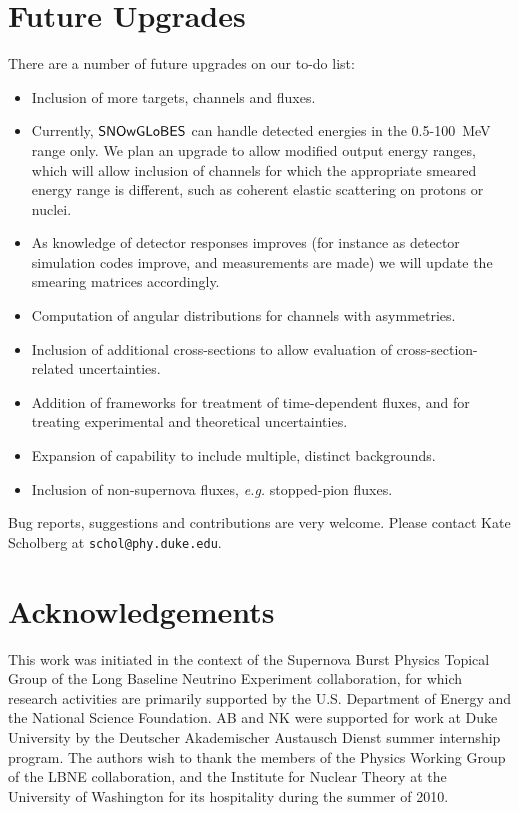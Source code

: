\documentclass[12pt]{article}
\newcommand{\snowglobes}{\sf{SNOwGLoBES}}
\begin{document}
\section{Future Upgrades}

There are a number of future upgrades on our to-do list:

\begin{itemize}

\item Inclusion of more targets, channels and fluxes.

\item Currently, $\snowglobes$ can handle detected energies in the
  0.5-100~MeV range only.  We plan an upgrade to allow modified output
  energy ranges, which will allow inclusion of channels for which
  the appropriate smeared energy range is different, such as coherent elastic
  scattering on protons or nuclei.

\item As knowledge of detector responses improves (for instance as
  detector simulation codes improve, and measurements are made) we
  will update the smearing matrices accordingly.  

\item Computation of angular distributions for channels with asymmetries.

\item Inclusion of additional cross-sections to allow evaluation of cross-section-related uncertainties.

\item Addition of frameworks for treatment of time-dependent fluxes, and for treating experimental and theoretical uncertainties.

\item Expansion of capability to include multiple, distinct backgrounds.


\item Inclusion of 
   non-supernova fluxes, \textit{e.g.} stopped-pion fluxes.

\end{itemize}

Bug reports, suggestions and contributions are very welcome.  Please
contact Kate Scholberg at \texttt{schol@phy.duke.edu}.


\section{Acknowledgements}

This work was initiated in the context of the Supernova Burst Physics
Topical Group of the Long Baseline Neutrino Experiment collaboration,
for which research activities are primarily supported by the
U.S. Department of Energy and the National Science Foundation.  AB and
NK were supported for work at Duke University by the Deutscher
Akademischer Austausch Dienst summer internship program.  The authors
wish to thank the members of the Physics Working Group of the LBNE
collaboration, and the Institute for Nuclear Theory at the
University of Washington for its
hospitality during the summer of 2010.
\end{document}
